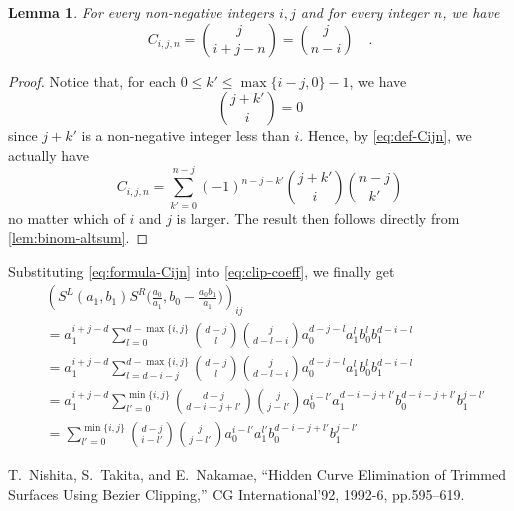 \documentclass[pdftex,a4paper,12pt]{scrartcl}
\theoremstyle{plain}
\newtheorem{lemma}[theorem]{Lemma}
\theoremstyle{definition}
\theoremstyle{remark}
\numberwithin{equation}{section}
\begin{document}
\begin{lemma}
\label{lem:formula-Cijn}
For every non-negative integers $i,j$ and for every integer $n$, we have
\begin{equation}
\label{eq:formula-Cijn}
C_{i,j,n} = \binom{j}{i+j-n} = \binom{j}{n-i}
\quad.
\end{equation}
\end{lemma}
\begin{proof}
Notice that, for each $0\le k'\le \max\{i-j,0\}-1$, we have
\[
\binom{j+k'}{i}=0
\]
since $j+k'$ is a non-negative integer less than $i$.
Hence, by \eqref{eq:def-Cijn}, we actually have
\[
C_{i,j,n}
= \sum_{k'=0}^{n-j}(-1)^{n-j-k'}\binom{j+k'}{i}\binom{n-j}{k'}
\]
no matter which of $i$ and $j$ is larger.
The result then follows directly from \cref{lem:binom-altsum}.
\end{proof}

Substituting \eqref{eq:formula-Cijn} into \eqref{eq:clip-coeff}, we finally get
\[
\begin{split}
&\left(S^L(a_1,b_1)S^R\bigl(\frac{a_0}{a_1},b_0-\frac{a_0b_1}{a_1}\bigr)\right)_{ij} \\
&= a_1^{i+j-d}\sum_{l=0}^{d-\max\{i,j\}}\binom{d-j}{l}\binom{j}{d-l-i}a_0^{d-j-l}a_1^lb_0^lb_1^{d-i-l} \\
&= a_1^{i+j-d}\sum_{l=d-i-j}^{d-\max\{i,j\}}\binom{d-j}{l}\binom{j}{d-l-i}a_0^{d-j-l}a_1^lb_0^lb_1^{d-i-l} \\
&= a_1^{i+j-d}\sum_{l'=0}^{\min\{i,j\}}\binom{d-j}{d-i-j+l'}\binom{j}{j-l'}a_0^{i-l'}a_1^{d-i-j+l'}b_0^{d-i-j+l'}b_1^{j-l'} \\
&= \sum_{l'=0}^{\min\{i,j\}}\binom{d-j}{i-l'}\binom{j}{j-l'}a_0^{i-l'}a_1^{l'}b_0^{d-i-j+l'}b_1^{j-l'}
\end{split}
\]

\begin{thebibliography}{99}
   T.~Nishita, S.~Takita, and E.~Nakamae, ``Hidden Curve Elimination of Trimmed Surfaces Using Bezier Clipping,'' CG International'92, 1992-6, pp.595--619.
\end{thebibliography}
\end{document}
